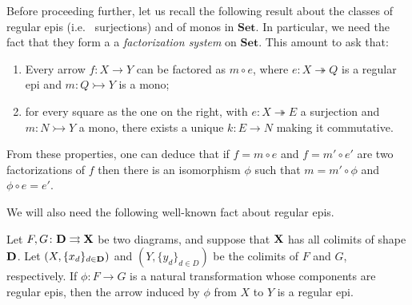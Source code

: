\documentclass[a4paper,UKenglish,cleveref,pdftex,thm-restate,numberwithinsect]{lipics-v2021}
\newcommand{\Set}{\mathbf{Set}}
\def\D{\textbf {\textup{D}}}
\def\X{\textbf {\textup{X}}}
\newcommand{\mto}{\rightarrowtail}
\newcommand{\eto}{\twoheadrightarrow}
\begin{document}
\begin{remark}\label{rem:fact}
	Before proceeding further, let us recall the following result about the classes of regular epis (i.e.~ surjections) and of monos in $\Set$. In particular, we need the fact that they form a a \emph{factorization system} \cite{kelly2006note} on $\Set$.  This amount to ask that:
	
	\noindent 
	\parbox{11.5cm}{
	\begin{enumerate} 
		\item Every arrow $f\colon X\to Y$ can be factored as $m\circ e$, where $e\colon X\eto Q$ is a regular epi and $m\colon Q\mto Y$ is a mono;
			\item for every square as the one on the right, with $e\colon X\eto E$ a surjection and $m\colon N\mto Y$ a mono, there exists a unique $k\colon E\to N$ making it commutative.
	\end{enumerate}}\hfill \parbox{2cm}{}
	
	\hspace{1pt}\newline 
	From these properties, one can deduce that if $f=m\circ e$ and $f=m'\circ e'$ are two factorizations of $f$ then there is an isomorphism $\phi$ such that $m=m'\circ \phi$ and $\phi \circ e=e'$.
\end{remark}

We will also need the following well-known fact about regular epis.

\begin{lemma}\label{lemma:nat_trans_reg_epi_canonical_arrow_reg_epi}
	Let $F,G\colon \D\rightrightarrows \X$ be two diagrams, and suppose that $\X$ has all colimits of shape $\D$. Let $(X, \{x_d\}_{d \in \D})$ and $(Y, \{y_d\}_{d\in D})$ be the colimits of $F$ and $G$, respectively.  If $\phi\colon  F \to G$ is a natural transformation whose components are regular epis, then the arrow induced by $\phi$ from $X$ to $Y$ is a regular epi.
\end{lemma}

\noindent
\parbox{11cm}{
\comp*}\hfill 
\parbox{2cm}{}   
\end{document}
